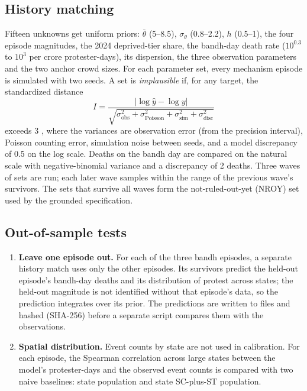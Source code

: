\documentclass[11pt,a4paper]{article}
\begin{document}
\subsection{History matching}
Fifteen unknowns get uniform priors: $\bar\theta$ (5--8.5), $\sigma_\theta$ (0.8--2.2), $h$ (0.5--1), the four episode magnitudes, the 2024 deprived-tier share, the bandh-day death rate ($10^{0.3}$ to $10^{3}$ per crore protester-days), its dispersion, the three observation parameters and the two anchor crowd sizes. For each parameter set, every mechanism episode is simulated with two seeds. A set is \emph{implausible} if, for any target, the standardized distance
\begin{equation}
I=\frac{|\log \hat y-\log y|}{\sqrt{\sigma^2_{\text{obs}}+\sigma^2_{\text{Poisson}}+\sigma^2_{\text{sim}}+\sigma^2_{\text{disc}}}}
\end{equation}
exceeds 3 \citep{vernon2010,andrianakis2015}, where the variances are observation error (from the precision interval), Poisson counting error, simulation noise between seeds, and a model discrepancy of 0.5 on the log scale. Deaths on the bandh day are compared on the natural scale with negative-binomial variance and a discrepancy of 2 deaths. Three waves of \CalibWaveSize{} sets are run; each later wave samples within the range of the previous wave's survivors. The sets that survive all waves form the not-ruled-out-yet (NROY) set used by the grounded specification.

\subsection{Out-of-sample tests}
\begin{enumerate}
\item \textbf{Leave one episode out.} For each of the three bandh episodes, a separate history match uses only the other episodes. Its survivors predict the held-out episode's bandh-day deaths and its distribution of protest across states; the held-out magnitude is not identified without that episode's data, so the prediction integrates over its prior. The predictions are written to files and hashed (SHA-256) before a separate script compares them with the observations.
\item \textbf{Spatial distribution.} Event counts by state are not used in calibration. For each episode, the Spearman correlation across large states between the model's protester-days and the observed event counts is compared with two naive baselines: state population and state SC-plus-ST population.
\end{enumerate}
\end{document}
